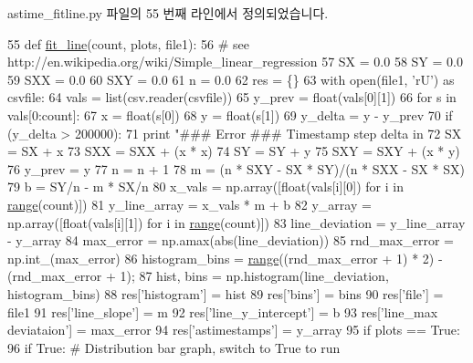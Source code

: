 astime\+\_\+fitline.\+py 파일의 55 번째 라인에서 정의되었습니다.


\begin{DoxyCode}
55 \textcolor{keyword}{def }\hyperlink{namespaceastime__fitline_aa22d126809119d4540a1f8700dbebf88}{fit\_line}(count, plots, file1):
56     \textcolor{comment}{# see http://en.wikipedia.org/wiki/Simple\_linear\_regression}
57     SX = 0.0
58     SY = 0.0
59     SXX = 0.0
60     SXY = 0.0
61     n = 0.0
62     res = \{\}
63     with open(file1, \textcolor{stringliteral}{'rU'}) \textcolor{keyword}{as} csvfile:
64         vals = list(csv.reader(csvfile))
65         y\_prev = float(vals[0][1])
66         \textcolor{keywordflow}{for} s \textcolor{keywordflow}{in} vals[0:count]:
67             x = float(s[0])
68             y = float(s[1])
69             y\_delta = y - y\_prev
70             \textcolor{keywordflow}{if} (y\_delta > 200000):
71                 \textcolor{keywordflow}{print} \textcolor{stringliteral}{"### Error ### Timestamp step delta in %
72             SX = SX + x
73             SXX = SXX + (x * x)
74             SY = SY + y
75             SXY = SXY + (x * y)
76             y\_prev = y
77             n = n + 1
78         m = (n * SXY - SX * SY)/(n * SXX - SX * SX)
79         b = SY/n - m * SX/n
80         x\_vals = np.array([float(vals[i][0]) \textcolor{keywordflow}{for} i \textcolor{keywordflow}{in} \hyperlink{structrange}{range}(count)])
81         y\_line\_array = x\_vals * m + b
82         y\_array = np.array([float(vals[i][1]) \textcolor{keywordflow}{for} i \textcolor{keywordflow}{in} \hyperlink{structrange}{range}(count)])
83         line\_deviation = y\_line\_array - y\_array
84         max\_error = np.amax(abs(line\_deviation))
85         rnd\_max\_error = np.int\_(max\_error)
86         histogram\_bins = \hyperlink{structrange}{range}((rnd\_max\_error + 1) * 2) - (rnd\_max\_error + 1);
87         hist, bins = np.histogram(line\_deviation, histogram\_bins)
88         res[\textcolor{stringliteral}{'histogram'}] = hist
89         res[\textcolor{stringliteral}{'bins'}] = bins
90         res[\textcolor{stringliteral}{'file'}] = file1
91         res[\textcolor{stringliteral}{'line\_slope'}] = m
92         res[\textcolor{stringliteral}{'line\_y\_intercept'}] = b
93         res[\textcolor{stringliteral}{'line\_max deviataion'}] = max\_error
94         res[\textcolor{stringliteral}{'astimestamps'}] = y\_array
95         \textcolor{keywordflow}{if} plots == \textcolor{keyword}{True}:
96             \textcolor{keywordflow}{if} \textcolor{keyword}{True}:    \textcolor{comment}{# Distribution bar graph, switch to True to run}
}
\end{DoxyCode}
